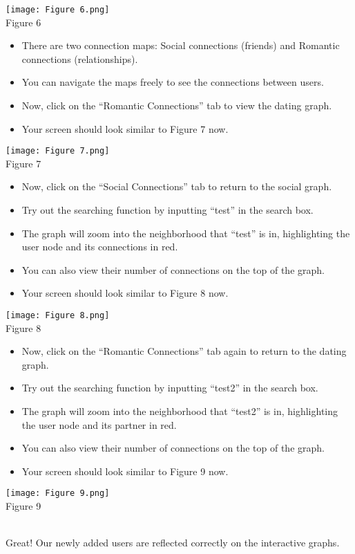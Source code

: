 \documentclass[fontsize=11pt]{article}
\begin{document}
\begin{center}
\texttt{[image: Figure 6.png]}
\\
\caption{Figure 6}
\end{center}
\newpage
\begin{itemize}
    \item There are two connection maps: Social connections (friends) and Romantic connections (relationships).
    \item You can navigate the maps freely to see the connections between users.
    \item Now, click on the ``Romantic Connections” tab to view the dating graph.
    \item Your screen should look similar to Figure 7 now.
\end{itemize}
\begin{center}
\texttt{[image: Figure 7.png]}
\\
\caption{Figure 7}
\end{center}
\newpage
\begin{itemize}
    \item Now, click on the ``Social Connections” tab to return to the social graph.
    \item Try out the searching function by inputting ``test” in the search box.
    \item The graph will zoom into the neighborhood that ``test” is in, highlighting the user node and its connections in red.
    \item You can also view their number of connections on the top of the graph.
    \item Your screen should look similar to Figure 8 now.
\end{itemize}
\begin{center}
\texttt{[image: Figure 8.png]}
\\
\caption{Figure 8}
\end{center}
\newpage
\begin{itemize}
    \item Now, click on the ``Romantic Connections” tab again to return to the dating graph.
    \item Try out the searching function by inputting ``test2” in the search box.
    \item The graph will zoom into the neighborhood that ``test2” is in, highlighting the user node and its partner in red.
    \item You can also view their number of connections on the top of the graph.
    \item Your screen should look similar to Figure 9 now.
\end{itemize}
\begin{center}
\texttt{[image: Figure 9.png]}
\\
\caption{Figure 9}
\end{center}
\\
Great! Our newly added users are reflected correctly on the interactive graphs.
\\
\end{document}
